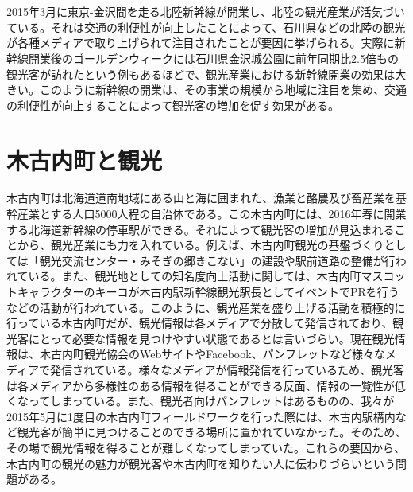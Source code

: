 \section{}
2015年3月に東京-金沢間を走る北陸新幹線が開業し、北陸の観光産業が活気づいている。それは交通の利便性が向上したことによって、石川県などの北陸の観光が各種メディアで取り上げられて注目されたことが要因に挙げられる。実際に新幹線開業後のゴールデンウィークには石川県金沢城公園に前年同期比2.5倍もの観光客が訪れたという例もあるほどで、観光産業における新幹線開業の効果は大きい。このように新幹線の開業は、その事業の規模から地域に注目を集め、交通の利便性が向上することによって観光客の増加を促す効果がある。

\section{木古内町と観光}
木古内町は北海道道南地域にある山と海に囲まれた、漁業と酪農及び畜産業を基幹産業とする人口5000人程の自治体である。この木古内町には、2016年春に開業する北海道新幹線の停車駅ができる。それによって観光客の増加が見込まれることから、観光産業にも力を入れている。例えば、木古内町観光の基盤づくりとしては「観光交流センター・みそぎの郷きこない」の建設や駅前道路の整備が行われている。また、観光地としての知名度向上活動に関しては、木古内町マスコットキャラクターのキーコが木古内駅新幹線観光駅長としてイベントでPRを行うなどの活動が行われている。このように、観光産業を盛り上げる活動を積極的に行っている木古内町だが、観光情報は各メディアで分散して発信されており、観光客にとって必要な情報を見つけやすい状態であるとは言いづらい。現在観光情報は、木古内町観光協会のWebサイトやFacebook、パンフレットなど様々なメディアで発信されている。様々なメディアが情報発信を行っているため、観光客は各メディアから多様性のある情報を得ることができる反面、情報の一覧性が低くなってしまっている。また、観光者向けパンフレットはあるものの、我々が2015年5月に1度目の木古内町フィールドワークを行った際には、木古内駅構内など観光客が簡単に見つけることのできる場所に置かれていなかった。そのため、その場で観光情報を得ることが難しくなってしまっていた。これらの要因から、木古内町の観光の魅力が観光客や木古内町を知りたい人に伝わりづらいという問題がある。

